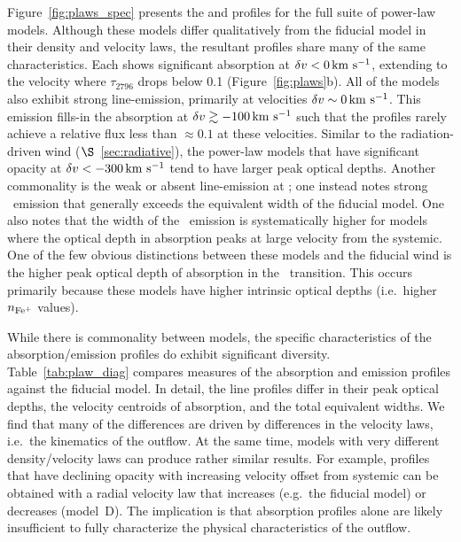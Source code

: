 \documentclass[12pt,preprint]{aastex}
\begin{document}
Figure~\ref{fig:plaws_spec} presents the  and 
profiles for the full suite of power-law models.  Although these
models differ qualitatively from the fiducial model in their density
and velocity laws, the resultant profiles share many of the same
characteristics.  Each shows significant absorption at $\delta v < 0
\, {\rm km~s^{-1}}$, extending to the velocity where $\tau_{2796}$ drops below 0.1
(Figure~\ref{fig:plaws}b).  All of the models also exhibit strong
line-emission, primarily at velocities $\delta v \sim 0 \, {\rm km~s^{-1}}$.  
This emission fills-in the  absorption at $\delta v \gtrsim
-100 \, {\rm km~s^{-1}}$ such that the profiles rarely achieve a relative flux less
than $\approx 0.1$ at these velocities. 
Similar to the radiation-driven wind ($\S$~\ref{sec:radiative}),
the power-law models that have significant opacity at $\delta v <
-300 \, {\rm km~s^{-1}}$ tend to have larger peak optical depths.  Another commonality is
the weak or absent line-emission at \feiia; one instead notes strong
\feiic\ emission that generally exceeds the equivalent width of the
fiducial model.  One also notes that the width of the \feiis\ emission
is systematically higher for models where the optical depth in
absorption peaks at large velocity from the systemic.
One of the few obvious distinctions between these models and the fiducial wind is
the higher peak optical depth of absorption in the \feiib\
transition.  This occurs primarily because these models have 
higher intrinsic optical depths (i.e.\ higher $n_{\rm Fe^+}$ values).

While there is commonality between models, the specific
characteristics of the absorption/emission profiles do exhibit
significant diversity.
Table~\ref{tab:plaw_diag} compares measures of the absorption and
emission profiles against the fiducial model.
In detail, the line profiles differ in their peak optical depths,
the velocity centroids of absorption, and the total equivalent widths.
We find that many of the differences are driven by differences in
the velocity laws, i.e.\ the kinematics of the outflow.
At the same time, models with very different density/velocity laws can
produce rather similar results.  For example, profiles that have declining
opacity with increasing velocity offset from systemic can be obtained
with a radial velocity law that increases (e.g.\ the fiducial model)
or decreases (model~D).  The implication is that absorption profiles
alone are likely insufficient to fully characterize the physical
characteristics of the outflow.


\end{document}
